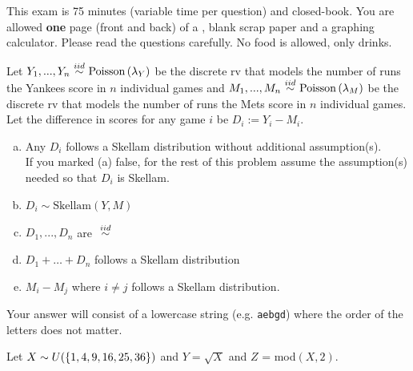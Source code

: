 \documentclass[12pt,landscape]{article}
\newcommand{\instr}{\small Your answer will consist of a lowercase string (e.g. \texttt{aebgd}) where the order of the letters does not matter. \normalsize}
\begin{document}
This exam is 75 minutes (variable time per question) and closed-book. You are allowed \textbf{one} page (front and back) of a , blank scrap paper and a graphing calculator. Please read the questions carefully. No food is allowed, only drinks. %

\pagebreak


\problem{} Let $Y_1, ..., Y_n \iid \poisson{\lambda_Y}$ be the discrete rv that models the number of runs the Yankees score in $n$ individual games and $M_1, ..., M_n \iid \poisson{\lambda_M}$ be the discrete rv that models the number of runs the Mets score in $n$ individual games. Let the difference in scores for any game $i$ be $D_i := Y_i - M_i$.

\vspace{-0.2cm}\benum{} 

\begin{enumerate}[(a)]
\item Any $D_i$ follows a Skellam distribution without additional assumption(s). \\

If you marked (a) false, for the rest of this problem assume the assumption(s) needed so that $D_i$ is Skellam.

\item $D_i \sim \text{Skellam}(Y, M)$
\item $D_1, ..., D_n$ are $\iid$
\item $D_1 + \ldots + D_n$ follows a Skellam distribution
\item $M_i - M_j$ where $i \neq j$ follows a Skellam distribution.
\end{enumerate}
\eenum\instr\pagebreak


\problem{} Let $X \sim U(\left\{1,4,9,16,25,36\right\})$ and $Y = \sqrt{X}$ and $Z$ = mod$(X, 2)$.
\end{document}
